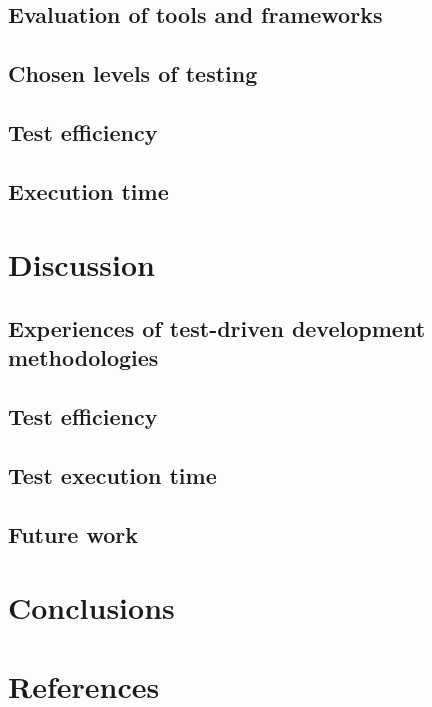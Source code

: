 \documentclass[a4paper]{report}
\begin{document}
  

  \section{Evaluation of tools and frameworks}
  

  \section{Chosen levels of testing}
  

  \section{Test efficiency}
  

  \section{Execution time}
  


\chapter{Discussion}
\label{chap:discussion}

  

  \section{Experiences of test-driven development methodologies}
  

  \section{Test efficiency}
  

  \section{Test execution time}
  

  \section{Future work}
  


\chapter{Conclusions}
\label{chap:conclusions}

    


\newpage

\chapter*{References}
\begin{multicols}{2}
    \small
    \renewcommand{\bibsection}{ \vspace{-\baselineskip}\vspace{-1.1mm} }
    
    
\end{multicols}
\end{document}
